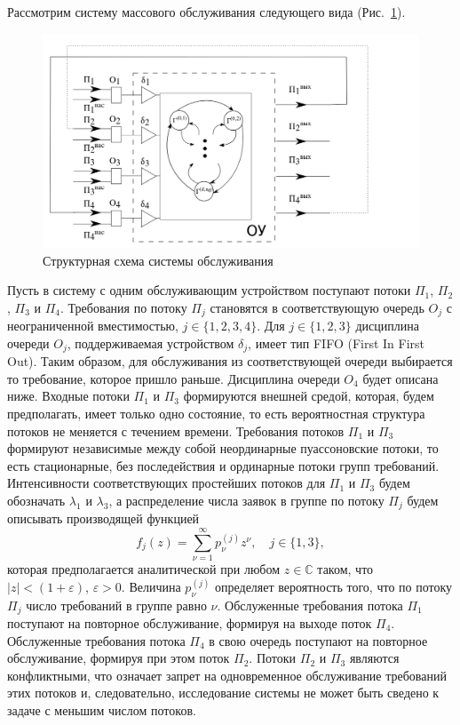 \documentclass[a4paper,12pt,russian]{extarticle}
\begin{document}
Рассмотрим систему массового обслуживания следующего вида (Рис.~\ref{SystemScheme}).
\begin{figure}[h]
\includegraphics[scale=0.5]{SystemScheme.png} 
\caption{Структурная схема системы обслуживания}
\label{SystemScheme}
\end{figure}

Пусть в систему с одним обслуживающим устройством поступают потоки $\Pi_1$, $\Pi_2$, $\Pi_3$  и $\Pi_4$. Требования по потоку $\Pi_j$ становятся в соответствующую очередь $O_j$ с неограниченной вместимостью, $j\in \{1, 2, 3, 4\}$. Для $j \in \{1, 2, 3\}$ дисциплина очереди $O_j$, поддерживаемая устройством $\delta_j$, имеет тип FIFO (First In First Out). Таким образом, для обслуживания из соответствующей очереди выбирается то требование, которое пришло раньше. Дисциплина очереди $O_4$ будет описана ниже. Входные потоки $\Pi_1$ и $\Pi_3$ формируются внешней средой, которая, будем предполагать, имеет только одно состояние, то есть вероятностная структура потоков не меняется с течением времени. Требования потоков $\Pi_1$ и $\Pi_3$ формируют независимые между собой неординарные пуассоновские потоки, то есть  стационарные, без последействия и ординарные потоки групп требований. Интенсивности соответствующих простейших потоков для $\Pi_1$ и $\Pi_3$ будем обозначать $\lambda_1$ и $\lambda_3$, а распределение числа заявок в группе по потоку $\Pi_j$ будем описывать производящей функцией
\begin{equation}
f_j(z) = \sum_{\nu=1}^{\infty} p_{\nu}^{(j)} z ^{\nu}, \quad j\in \{1,3\},
\label{GeneratingFunc}
\end{equation}
которая предполагается аналитической при любом $z\in \mathbb{C}$ таком, что $|z|<(1+\varepsilon)$, $\varepsilon>0$. Величина $p_{\nu}^{(j)}$ определяет вероятность того, что по потоку $\Pi_j$ число требований в группе равно $\nu$. Обслуженные требования потока $\Pi_1$ поступают на повторное обслуживание, формируя на выходе поток $\Pi_4$. Обслуженные требования потока $\Pi_4$ в свою очередь поступают на повторное обслуживание, формируя при этом поток $\Pi_2$. Потоки $\Pi_2$ и $\Pi_3$ являются конфликтными, что означает запрет на одновременное обслуживание требований этих потоков и, следовательно, исследование системы не может быть сведено к задаче с меньшим числом потоков. 
\end{document}
